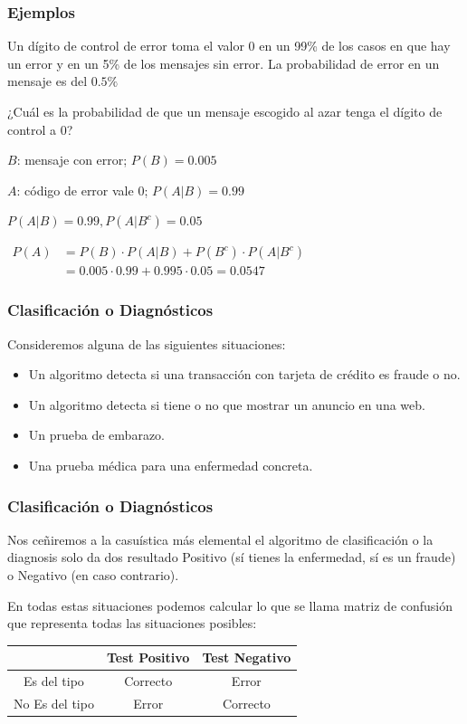 \documentclass[handout]{beamer}\usepackage[]{graphicx}\usepackage[]{color}
\renewcommand{\emph}[1]{{\color{red}#1}}
\theoremstyle{plain}
\theoremstyle{definition}
\begin{document}
\begin{frame}
\frametitle{Ejemplos}  
Un dígito de control de error toma  el valor 0  en un 99\% de los casos en que hay un error y en un 5\%  de los mensajes sin error.
La probabilidad de error en un mensaje es  del $0.5\%$ 

¿Cuál es la probabilidad de  que un mensaje escogido al azar tenga el dígito de control a 0?

\medskip

$B$: mensaje con error; $P(B)=0.005$
\medskip

$A$: código de error vale 0;
$P(A|B)=0.99$

\medskip



$P(A|B)=0.99, P(A|B^c)= 0.05$
\bigskip

{\hspace*{-1ex}$\begin{array}{rl}
P(A) & =P(B)\cdot P(A|B)+P(B^c)\cdot P(A|B^c)\\ &
=0.005\cdot 0.99+0.995\cdot 0.05=0.0547\end{array}$}
\end{frame}



\begin{frame}
\frametitle{Clasificación o Diagnósticos}

Consideremos alguna de las siguientes situaciones:

\begin{itemize}
\item Un algoritmo detecta si una transacción con tarjeta de crédito es fraude o no.
\item Un algoritmo detecta si  tiene o no que mostrar un anuncio en una web.
\item Un prueba de embarazo. 
\item Una prueba médica  para  una enfermedad concreta.
\end{itemize}
\end{frame}

\begin{frame}
\frametitle{Clasificación o Diagnósticos}
Nos ceñiremos a la casuística más elemental  el algoritmo de clasificación o la diagnosis solo da dos resultado Positivo (sí tienes la enfermedad, sí es un fraude) o Negativo (en caso contrario). 

\vfill
En todas estas situaciones  podemos calcular lo que se llama \emph{matriz de confusión} que representa todas las situaciones posibles:
\vfill
\begin{centering}
\begin{tabular}{c||c|c}
 & Test Positivo & Test Negativo \\\hline
Es del tipo & Correcto & Error\\
No Es del tipo & Error & Correcto\\\hline
\end{tabular}
\end{centering}
\end{frame}
\end{document}
